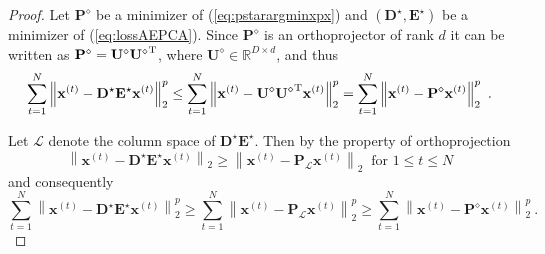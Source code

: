 \documentclass{article} \usepackage{iclr2020_conference,times}
\def\eqref#1{(\ref{#1})}
\def\LL{{\mathscr{L}}}
\def\rvx{{\mathbf{x}}}
\def\rmD{{\mathbf{D}}}
\def\rmE{{\mathbf{E}}}
\def\rmP{{\mathbf{P}}}
\def\rmU{{\mathbf{U}}}
\newcommand{\R}{\mathbb{R}}
\newcommand{\norm}[1]{\left\lVert#1\right\rVert}
\begin{document}
\begin{proof}
Let $\rmP^{\diamond}$ be a minimizer of \eqref{eq:pstarargminxpx} and 
$(\rmD^{\star}, \rmE^{\star})$ be a minimizer of \eqref{eq:lossAEPCA}. Since $\rmP^{\diamond}$ is an orthoprojector of rank $d$ it can be written as $\rmP^{\diamond} = \rmU^{\diamond} {\rmU^{\diamond}}^{\rm{T}}$, where $\rmU^{\diamond} \in \R^{D \times d}$, and thus
\begin{equation}
\label{eq:deuutp}
    \sum_{t=1}^N \norm{\rvx^{(t)} - \rmD^{\star} \rmE^{\star} \rvx^{(t)}}_2^p \leq \sum_{t=1}^N \norm{\rvx^{(t)} - \rmU^{\diamond} {\rmU^{\diamond}}^{\rm{T}} \rvx^{(t)}}_2^p = \sum_{t=1}^N \norm{\rvx^{(t)} - \rmP^{\diamond} \rvx^{(t)}}_2^p ~.
\end{equation}

Let $\LL$ denote the column space of $\rmD^{\star} \rmE^{\star}$. Then by the property of orthoprojection
\begin{equation}
\label{eq:deplp0}
    \norm{\rvx^{(t)} - \rmD^{\star} \rmE^{\star} \rvx^{(t)}}_2 
    \geq 
    \norm{\rvx^{(t)} - \rmP_{\LL} \rvx^{(t)}}_2 \ \text{ for } 1 \leq t \leq N
\end{equation}
and consequently
\begin{equation}
\label{eq:deplp}
    \sum_{t=1}^N \norm{\rvx^{(t)} - \rmD^{\star} \rmE^{\star} \rvx^{(t)}}_2^p \geq \sum_{t=1}^N \norm{\rvx^{(t)} - \rmP_{\LL} \rvx^{(t)}}_2^p \geq \sum_{t=1}^N \norm{\rvx^{(t)} - \rmP^{\diamond} \rvx^{(t)}}_2^p ~.
\end{equation}



\end{proof}
\end{document}
